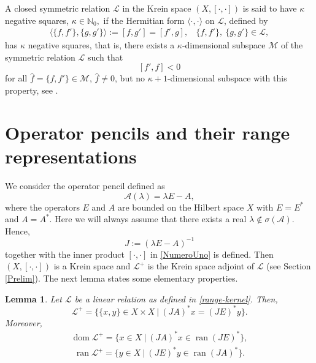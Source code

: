 \documentclass{birkjour}
\newtheorem{lem}[thm]{Lemma}
\theoremstyle{definition}
\theoremstyle{remark}
\numberwithin{equation}{section}
\newcommand{\A}{\mathcal A}
\newcommand{\Ll}{\mathcal L}
\DeclareMathOperator{\dom}{dom}
\DeclareMathOperator{\ran}{ran}
\begin{document}
 A closed symmetric relation $\Ll$ in the Krein space  $(X, [\cdot, \cdot])$ is said to have $\kappa$ negative squares, $\kappa \in \mathbb{N}_0,$ if the Hermitian form $\langle\cdot, \cdot\rangle $ on $\Ll$, defined by \begin{align*}
    \langle\{f,f'\}, \{g,g'\}\rangle  := [f,g']= [f',g], \ \ \ \  \{f,f'\} ,\ \{g,g'\}\in \Ll, 
\end{align*}
    has $\kappa$ negative squares, that is, there exists a $\kappa$-dimensional subspace $\mathcal{M}$ of the symmetric relation $\Ll$ such that  
    $$
    [f', f] <0 
    $$
    for all $\hat{f}=\{f,f'\}\in \mathcal{M}$, $\hat{f}\neq 0$, but no $\kappa+1$-dimensional subspace with this property, see \cite{BLT13}.


\section{Operator pencils and their range representations}
We consider the operator pencil defined as 
$$
\A(\lambda)= \lambda E-A, 
$$ 
where the operators $E$ and $A$ are bounded on the Hilbert space $X$ with $E=E^{*}$ and $A=A^{*}$.  Here we will always assume that there exists a real $\lambda \notin \sigma(\A)$. Hence,
$$
J:= (\lambda E-A)^{-1}
$$ 
together with the inner product $[\cdot,\cdot]$ in \eqref{NumeroUno} is defined. Then $(X, [\cdot,\cdot])$
is a Krein space and $\Ll^+$ is the Krein space adjoint of $\Ll$ (see Section \ref{Prelim}). The next lemma states some elementary properties.


\begin{lem} \label{Properties} 
Let $\mathcal{L}$  be a linear relation as defined in \eqref{range-kernel}. Then,
\begin{equation} \label{Krein Adjoint of L} 
\mathcal{L}^{+} = \{\{x,y\}\in X \times X~|~ (JA)^{*}x=(JE)^{*}y \}.
\end{equation} 
Moreover,  
\begin{align} \label{dom}
    \dom \mathcal{L}^{+}=\{x\in X~|~ (JA)^{*}x\in \ran (JE)^{*}\},
\end{align} 
\begin{align} \label{ran}
 \ran \mathcal{L}^{+}=\{y\in X~|~ (JE)^{*}y\in \ran (JA)^{*}\}.
\end{align}
\end{lem}
\end{document}
